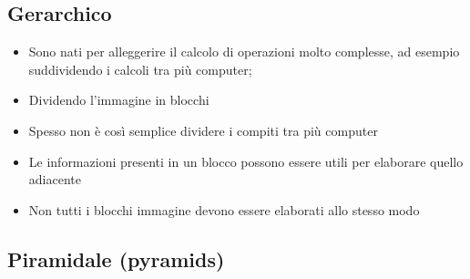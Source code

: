 \documentclass{report}
\begin{document}
\subsection{Gerarchico}
\label{sec:hierarchical}
\begin{itemize}
\item Sono nati per alleggerire il calcolo di operazioni molto complesse,
  ad esempio suddividendo i calcoli tra più computer;
\item Dividendo l'immagine in blocchi
\item Spesso non è così semplice dividere i compiti tra più computer
\item Le informazioni presenti in un blocco possono essere utili per
  elaborare quello adiacente
\item Non tutti i blocchi immagine devono essere elaborati allo stesso
  modo
\end{itemize}

\subsection{Piramidale (pyramids)}
\label{sec:pyramid}
\end{document}
